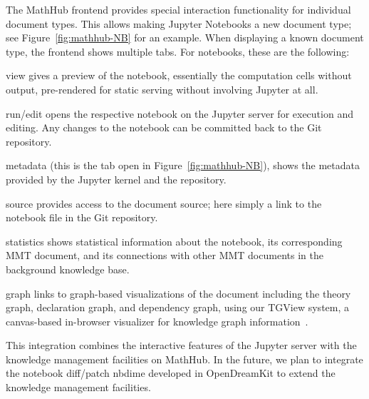 The MathHub frontend provides special interaction functionality for individual document types.
This allows making Jupyter Notebooks a new document type; see Figure~\ref{fig:mathhub-NB} for an example.
When displaying a known document type, the frontend shows multiple tabs.
For notebooks, these are the following:
\begin{compactenum}[\em i\rm)]
\item \textsf{view} gives a preview of the notebook, essentially the computation cells without output, pre-rendered for static serving without involving Jupyter at all.%
\item \textsf{run/edit} opens the respective notebook on the Jupyter server for execution and editing.
Any changes to the notebook can be committed back to the Git repository. 
\item \textsf{metadata} (this is the tab open in Figure~\ref{fig:mathhub-NB}), shows the metadata provided by the Jupyter kernel and the repository. 
\item \textsf{source} provides access to the document source; here simply a link to the notebook file in the Git repository.
\item \textsf{statistics} shows statistical information about the notebook, its corresponding MMT document, and its connections with other MMT documents in the background knowledge base.
\item \textsf{graph} links to graph-based visualizations of the document including the theory graph, declaration graph, and dependency graph, using our TGView system, a canvas-based in-browser visualizer for knowledge graph information~\cite{RupKohMue:fitgv17}.
\end{compactenum}
This integration combines the interactive features of the Jupyter server with the knowledge management facilities on MathHub. In the future, we plan to integrate the notebook diff/patch \textsf{nbdime} developed in OpenDreamKit to extend the knowledge management facilities. 

